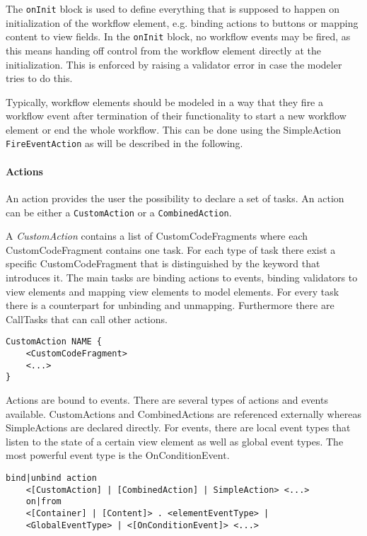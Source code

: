 The \lstinline!onInit! block is used to define everything that is supposed to happen on initialization of the workflow element, e.g. binding actions to buttons or mapping content to view fields. In the \lstinline!onInit! block, no workflow events may be fired, as this means handing off control from the workflow element directly at the initialization. This is enforced by raising a validator error in case the modeler tries to do this.

Typically, workflow elements should be modeled in a way that they fire a workflow event after termination of their functionality to start a new workflow element or end the whole workflow. This can be done using the SimpleAction \lstinline!FireEventAction! as will be described in the following.

\paragraph{Actions}
An action provides the user the possibility to declare a set of tasks. An action can be either a \lstinline!CustomAction! or a \lstinline!CombinedAction!.

A \textit{CustomAction} contains a list of CustomCodeFragments where each CustomCodeFragment contains one task. For each type of task there exist a specific CustomCodeFragment that is distinguished by the keyword that introduces it. The main tasks are binding actions to events, binding validators to view elements and mapping view elements to model elements. For every task there is a counterpart for unbinding and unmapping. Furthermore there are CallTasks that can call other actions.

\begin{lstlisting}
CustomAction NAME {
	<CustomCodeFragment>
	<...>
}
\end{lstlisting}

Actions are bound to events. There are several types of actions and events available. CustomActions and CombinedActions are referenced externally whereas SimpleActions are declared directly. For events, there are local event types that listen to the state of a certain view element as well as global event types. The most powerful event type is the OnConditionEvent.

\begin{lstlisting}
bind|unbind action
	<[CustomAction] | [CombinedAction] | SimpleAction> <...>
	on|from
	<[Container] | [Content]> . <elementEventType> |
	<GlobalEventType> | <[OnConditionEvent]> <...>
\end{lstlisting}

